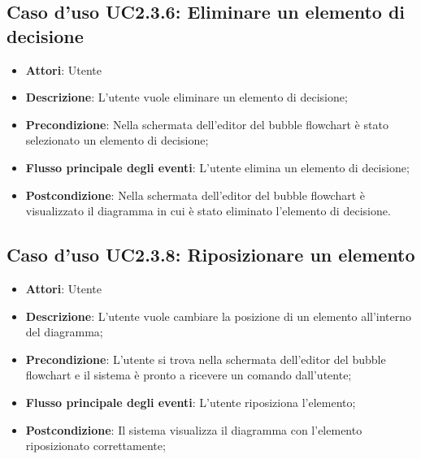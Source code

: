 \documentclass[../AnalisiDeiRequisiti.tex]{subfiles}
\begin{document}
					\subsection{Caso d'uso UC2.3.6: Eliminare un elemento di decisione}
					\begin{itemize}
						\item \textbf{Attori}: Utente
						\item \textbf{Descrizione}: L'utente vuole eliminare un elemento di decisione;
						\item \textbf{Precondizione}: Nella schermata dell'editor del bubble flowchart è stato selezionato un elemento di decisione;
						\item \textbf{Flusso principale degli eventi}: L'utente elimina un elemento di decisione;
						\item \textbf{Postcondizione}: Nella schermata dell'editor del bubble flowchart è visualizzato il diagramma in cui è stato eliminato l'elemento di decisione.
					\end{itemize}
					\subsection{Caso d'uso UC2.3.8: Riposizionare un elemento}
					\begin{itemize}
						\item \textbf{Attori}: Utente
						\item \textbf{Descrizione}: L'utente vuole cambiare la posizione di un elemento all'interno del diagramma;
						\item \textbf{Precondizione}: L'utente si trova nella schermata dell'editor del bubble flowchart e il sistema è pronto a ricevere un comando dall'utente;
						\item \textbf{Flusso principale degli eventi}: L'utente riposiziona l'elemento;
						\item \textbf{Postcondizione}: Il sistema visualizza il diagramma con l'elemento riposizionato correttamente;
					\end{itemize}
					
\end{document}
